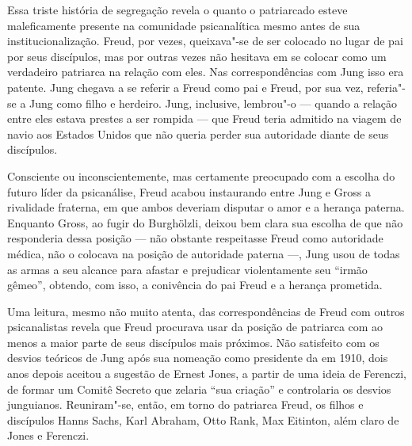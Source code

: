 Essa triste história de segregação revela o quanto o patriarcado esteve
maleficamente presente na comunidade psicanalítica mesmo antes de sua
institucionalização. Freud, por vezes, queixava"-se de ser colocado no
lugar de pai por seus discípulos, mas por outras vezes não hesitava em
se colocar como um verdadeiro patriarca na relação com eles. Nas
correspondências com Jung isso era patente. Jung chegava a se referir a
Freud como pai e Freud, por sua vez, referia"-se a Jung como filho e
herdeiro. Jung, inclusive, lembrou"-o --- quando a relação entre eles
estava prestes a ser rompida --- que Freud teria admitido na viagem de
navio aos Estados Unidos que não queria perder sua autoridade diante de
seus discípulos.

Consciente ou inconscientemente, mas certamente preocupado com a escolha
do futuro líder da psicanálise, Freud acabou instaurando entre Jung e
Gross a rivalidade fraterna, em que ambos deveriam disputar o amor e a
herança paterna. Enquanto Gross, ao fugir do Burghölzli, deixou bem
clara sua escolha de que não responderia dessa posição --- não obstante
respeitasse Freud como autoridade médica, não o colocava na posição de
autoridade paterna ---, Jung usou de todas as armas a seu alcance para
afastar e prejudicar violentamente seu ``irmão gêmeo'', obtendo, com
isso, a conivência do pai Freud e a herança prometida.

Uma leitura, mesmo não muito atenta, das correspondências de Freud com
outros psicanalistas revela que Freud procurava usar da posição de
patriarca com ao menos a maior parte de seus discípulos mais próximos.
Não satisfeito com os desvios teóricos de Jung após sua nomeação como
presidente da  em 1910, dois anos depois aceitou a sugestão de Ernest
Jones, a partir de uma ideia de Ferenczi, de formar um Comitê Secreto
que zelaria ``sua criação'' e controlaria os desvios junguianos.
Reuniram"-se, então, em torno do patriarca Freud, os filhos e discípulos
Hanns Sachs, Karl Abraham, Otto Rank, Max Eitinton, além claro de Jones
e Ferenczi.

